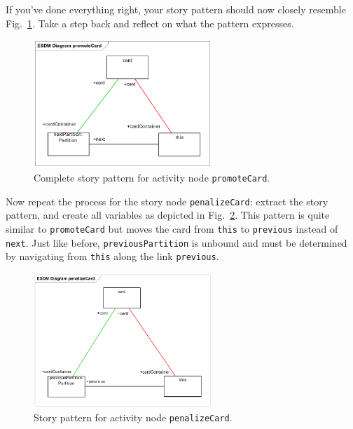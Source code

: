If you've done everything right, your story pattern should now closely resemble
Fig.~\ref{fig:sdm_check_complete_activity_node}.  Take a step back and reflect
on what the pattern expresses.

\begin{figure}[htbp] 
\begin{center}
  \includegraphics[width=0.6\textwidth]{pics/sdmBilder/check/sdm30}
  \caption{Complete story pattern for activity node \texttt{promoteCard}.}  
  \label{fig:sdm_check_complete_activity_node}
\end{center}
\end{figure}

\clearpage

Now repeat the process for the story node \texttt{penalizeCard}: extract the
story pattern, and create all variables as depicted in
Fig.~\ref{fig:sdm_check_complete_penalize}.  This pattern is quite similar to
\texttt{promoteCard} but moves the card from \texttt{this} to \texttt{previous}
instead of \texttt{next}.  Just like before, \texttt{previousPartition} is
unbound and must be determined by navigating from \texttt{this} along the link
\texttt{previous}.

\begin{figure}[htbp]
\begin{center}
  \includegraphics[width=0.6\textwidth]{pics/sdmBilder/check/sdm38}
  \caption{Story pattern for activity node \texttt{penalizeCard}.}  
  \label{fig:sdm_check_complete_penalize}
\end{center}
\end{figure}

